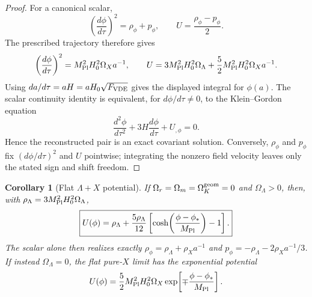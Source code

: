 \documentclass[11pt,a4paper]{article}
\def\dd{d}%
\numberwithin{equation}{section}
\theoremstyle{definition}
\theoremstyle{plain}
\newtheorem{corollary}[criterion]{Corollary}
\theoremstyle{remark}
\newcommand{\dd}{\mathrm{d}}
\begin{document}
\begin{proof}
For a canonical scalar,
\begin{equation}
\left(\frac{\dd\phi}{\dd\tau}\right)^2=\rho_\phi+p_\phi,
\qquad
U=\frac{\rho_\phi-p_\phi}{2}.
\end{equation}
The prescribed trajectory therefore gives
\begin{equation}
\left(\frac{\dd\phi}{\dd\tau}\right)^2
=M_{\rm Pl}^2H_0^2\Omega_Xa^{-1},
\qquad
U=3M_{\rm Pl}^2H_0^2\Omega_\Lambda
+\frac52M_{\rm Pl}^2H_0^2\Omega_Xa^{-1}.
\end{equation}
Using $\dd a/\dd\tau=aH=aH_0\sqrt{F_{\rm VDE}}$ gives the displayed integral for
$\phi(a)$.
The scalar continuity identity is equivalent, for $\dd\phi/\dd\tau\neq0$, to the
Klein--Gordon equation
\begin{equation}
\frac{\dd^2\phi}{\dd\tau^2}+3H\frac{\dd\phi}{\dd\tau}+U_{,\phi}=0.
\end{equation}
Hence the reconstructed pair is an exact covariant solution.  Conversely,
$\rho_\phi$ and $p_\phi$ fix $(\dd\phi/\dd\tau)^2$ and $U$ pointwise; integrating the
nonzero field velocity leaves only the stated sign and shift freedom.
\end{proof}

\begin{corollary}[Flat $\Lambda+X$ potential]
If $\Omega_r=\Omega_m=\Omega_K^{\rm geom}=0$ and $\Omega_\Lambda>0$, then, with
$\rho_\Lambda=3M_{\rm Pl}^2H_0^2\Omega_\Lambda$,
\begin{equation}
\boxed{
U(\phi)=\rho_\Lambda+
\frac{5\rho_\Lambda}{12}
\left[\cosh\!\left(\frac{\phi-\phi_*}{M_{\rm Pl}}\right)-1\right].}
\end{equation}
The scalar alone then realizes exactly
$\rho_\phi=\rho_\Lambda+\rho_Xa^{-1}$ and
$p_\phi=-\rho_\Lambda-2\rho_Xa^{-1}/3$.
If instead $\Omega_\Lambda=0$, the flat pure-$X$ limit has the exponential
potential
\begin{equation}
U(\phi)=\frac52M_{\rm Pl}^2H_0^2\Omega_X
\exp\!\left[\mp\frac{\phi-\phi_*}{M_{\rm Pl}}\right].
\end{equation}
\end{corollary}
\end{document}
